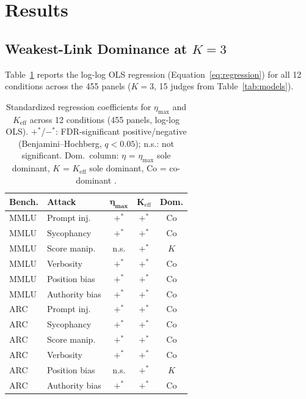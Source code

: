 \section{Results}
\label{sec:results}

\subsection{Weakest-Link Dominance at \texorpdfstring{$K{=}3$}{K=3}}
\label{sec:dominance}

Table~\ref{tab:dominance} reports the log-log OLS regression (Equation~\ref{eq:regression}) for all 12 conditions across the 455 panels ($K{=}3$, 15 judges from Table~\ref{tab:models}).

\begin{table}[t]
\centering
\small
\begin{tabular}{llccc}
\toprule
\textbf{Bench.} & \textbf{Attack} & $\boldsymbol{\eta_{\max}}$ & $\boldsymbol{K_{\mathrm{eff}}}$ & \textbf{Dom.} \\
\midrule
MMLU & Prompt inj.    & $+^{*}$ & $+^{*}$ & Co \\
MMLU & Sycophancy     & $+^{*}$ & $+^{*}$ & Co \\
MMLU & Score manip.   & n.s.    & $+^{*}$ & $K$ \\
MMLU & Verbosity      & $+^{*}$ & $+^{*}$ & Co \\
MMLU & Position bias  & $+^{*}$ & $+^{*}$ & Co \\
MMLU & Authority bias & $+^{*}$ & $+^{*}$ & Co \\
\addlinespace
ARC  & Prompt inj.    & $+^{*}$ & $+^{*}$ & Co \\
ARC  & Sycophancy     & $+^{*}$ & $+^{*}$ & Co \\
ARC  & Score manip.   & $+^{*}$ & $+^{*}$ & Co \\
ARC  & Verbosity      & $+^{*}$ & $+^{*}$ & Co \\
ARC  & Position bias  & n.s.    & $+^{*}$ & $K$ \\
ARC  & Authority bias & $+^{*}$ & $+^{*}$ & Co \\
\bottomrule
\end{tabular}
\caption{Standardized regression coefficients for $\eta_{\max}$ and $K_{\mathrm{eff}}$ across 12 conditions (455 panels, log-log OLS). $+^{*}$/$-^{*}$: FDR-significant positive/negative (Benjamini--Hochberg, $q < 0.05$); n.s.: not significant. Dom.\ column: $\eta$ = $\eta_{\max}$ sole dominant, $K$ = $K_{\mathrm{eff}}$ sole dominant, Co = co-dominant \citep{budescu1993dominance}.}
\label{tab:dominance}
\end{table}

